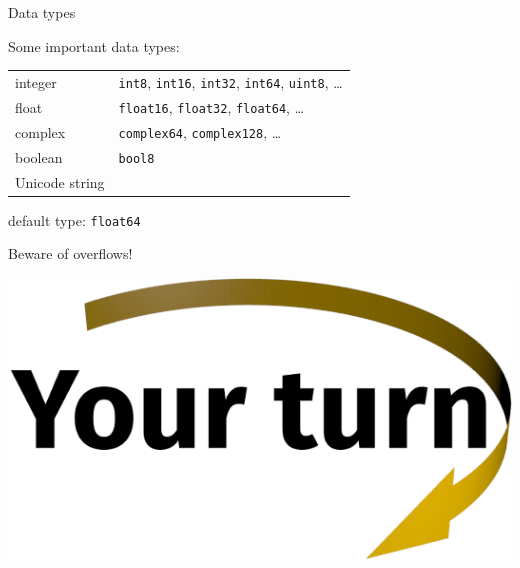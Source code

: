 \documentclass[svgnames]{beamer}
\begin{document}
\begin{frame}{Data types}

\vspace{0.2truecm}
Some important data types:

\vspace{0.2truecm}
\begin{tabular}{ll}
integer & \texttt{int8}, \texttt{int16}, \texttt{int32}, \texttt{int64}, \texttt{uint8}, \dots\\[0.2truecm]
float   & \texttt{float16}, \texttt{float32}, \texttt{float64}, \dots \\[0.2truecm]
complex & \texttt{complex64}, \texttt{complex128}, \dots\\[0.2truecm]
boolean & \texttt{bool8}\\[0.2truecm]
Unicode string  & \\
\end{tabular}

\vspace{0.2truecm}
default type: \texttt{float64}

\vspace{0.3truecm}
\begin{center}
 \alert{\raisebox{0.4em}{\dbend}\quad Beware of overflows!}
\end{center}

\vspace{0.3truecm}
\begin{center}
 \includegraphics[width=3truecm]{yourturn}
\end{center}
\end{frame}
\end{document}
